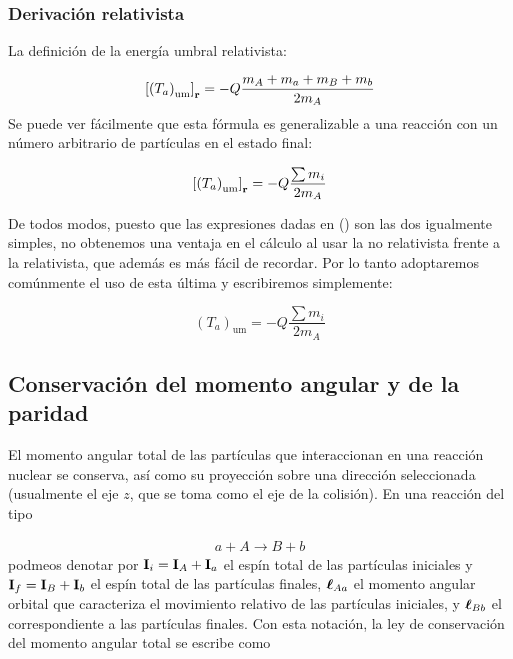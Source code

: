 \subsubsection{Derivación relativista}

La definición de la energía umbral relativista:

\begin{equation}
		\left[ \left( T_a \right)_{\text{um}} \right]_{\textbf{r}} = - Q \frac{m_A + m_a +m_B + m_b}{2m_A}
\end{equation}
Se puede ver fácilmente que esta fórmula es generalizable a una reacción con un número arbitrario de partículas en el estado final:

\begin{equation}
	\left[ \left( T_a \right)_{\text{um}} \right]_{\textbf{r}} = - Q \frac{\sum m_i}{2m_A}
\end{equation}

De todos modos, puesto que las expresiones dadas en () son las dos igualmente simples, no obtenemos una ventaja en el cálculo al usar la no relativista frente a la relativista, que además es más fácil de recordar. Por lo tanto adoptaremos comúnmente el uso de esta última y escribiremos simplemente:

\begin{mybox}
\begin{equation}
	(T_a)_{\text{um}} = -Q\frac{\sum m_i}{2m_A}
\end{equation}
\end{mybox}




\subsection{Conservación del momento angular y de la paridad}

El momento angular total de las partículas que interaccionan en una reacción nuclear se conserva, así como su proyección sobre una dirección seleccionada (usualmente el eje $z$, que se toma como el eje de la colisión). En una reacción del tipo 

\begin{eqnarray}
    a + A \longrightarrow B + b
\end{eqnarray}
podmeos denotar por $\mathbf{I}_i = \mathbf{I}_A + \mathbf{I}_a$ el espín total de las partículas iniciales y $\mathbf{I}_f=\mathbf{I}_B + \mathbf{I}_b$ el espín total de las partículas finales, $\boldsymbol{\ell}_{Aa}$ el momento angular orbital que caracteriza el movimiento relativo de las partículas iniciales, y $\boldsymbol{\ell}_{Bb}$ el correspondiente a las partículas finales. Con esta notación, la ley de conservación del momento angular total se escribe como 

